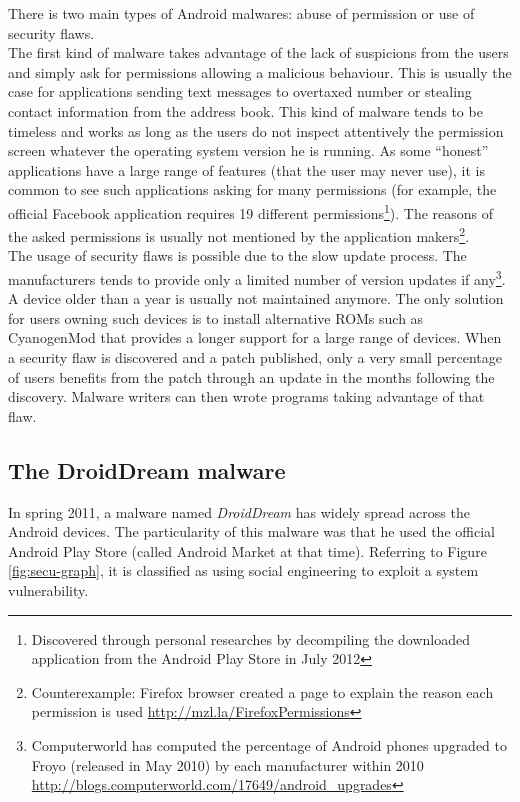 There is two main types of Android malwares: abuse of permission or use of security flaws.\\

The first kind of malware takes advantage of the lack of suspicions from the users and simply ask for permissions allowing a malicious behaviour.
This is usually the case for applications sending text messages to overtaxed number or stealing contact information from the address book.
This kind of malware tends to be timeless and works as long as the users do not inspect attentively the permission screen whatever the operating system version he is running.
As some ``honest'' applications have a large range of features (that the user may never use), it is common to see such applications asking for many permissions (for example, the official Facebook application requires 19 different permissions\footnote{Discovered through personal researches by decompiling the downloaded application from the Android Play Store in July 2012}).
The reasons of the asked permissions is usually not mentioned by the application makers\footnote{Counterexample: Firefox browser created a page to explain the reason each permission is used \url{http://mzl.la/FirefoxPermissions}}.\\

The usage of security flaws is possible due to the slow update process.
The manufacturers tends to provide only a limited number of version updates if any\footnote{Computerworld has computed the percentage of Android phones upgraded to Froyo (released in May 2010) by each manufacturer within 2010 \url{http://blogs.computerworld.com/17649/android_upgrades}}.
A device older than a year is usually not maintained anymore.
The only solution for users owning such devices is to install alternative ROMs such as CyanogenMod that provides a longer support for a large range of devices.
When a security flaw is discovered and a patch published, only a very small percentage of users benefits from the patch through an update in the months following the discovery.
Malware writers can then wrote programs taking advantage of that flaw.\\

\subsection{The DroidDream malware}

In spring 2011, a malware named \emph{DroidDream} has widely spread across the Android devices.
The particularity of this malware was that he used the official Android Play Store (called Android Market at that time).
Referring to Figure \ref{fig:secu-graph}, it is classified as using social engineering to exploit a system vulnerability.\\

